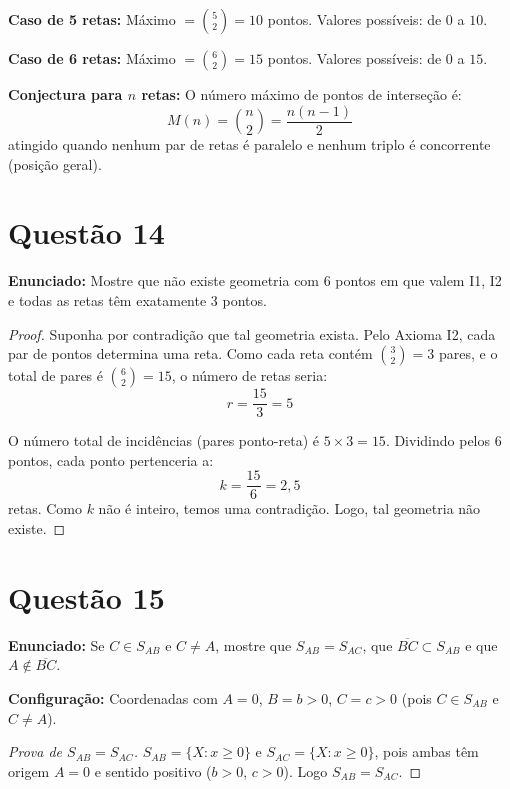 \documentclass[12pt,a4paper]{article}
\begin{document}
\textbf{Caso de 5 retas:} M\'aximo $= \binom{5}{2} = 10$ pontos. Valores poss\'iveis: de $0$ a $10$.

\textbf{Caso de 6 retas:} M\'aximo $= \binom{6}{2} = 15$ pontos. Valores poss\'iveis: de $0$ a $15$.

\textbf{Conjectura para $n$ retas:} O n\'umero m\'aximo de pontos de interse\c{c}\~ao \'e:
$$\boxed{M(n) = \binom{n}{2} = \frac{n(n-1)}{2}}$$
atingido quando nenhum par de retas \'e paralelo e nenhum triplo \'e concorrente (posi\c{c}\~ao geral).

\section*{Quest\~ao 14}

\textbf{Enunciado:} Mostre que n\~ao existe geometria com 6 pontos em que valem I1, I2 e todas as retas t\^em exatamente 3 pontos.

\begin{proof}
Suponha por contradi\c{c}\~ao que tal geometria exista. Pelo Axioma I2, cada par de pontos determina uma reta. Como cada reta cont\'em $\binom{3}{2} = 3$ pares, e o total de pares \'e $\binom{6}{2} = 15$, o n\'umero de retas seria:
$$r = \frac{15}{3} = 5$$

O n\'umero total de incid\^encias (pares ponto-reta) \'e $5 \times 3 = 15$. Dividindo pelos 6 pontos, cada ponto pertenceria a:
$$k = \frac{15}{6} = 2{,}5$$
retas. Como $k$ n\~ao \'e inteiro, temos uma contradi\c{c}\~ao. Logo, tal geometria n\~ao existe.
\end{proof}

\section*{Quest\~ao 15}

\textbf{Enunciado:} Se $C \in S_{AB}$ e $C \neq A$, mostre que $S_{AB} = S_{AC}$, que $\overline{BC} \subset S_{AB}$ e que $A \notin \overline{BC}$.

\textbf{Configura\c{c}\~ao:} Coordenadas com $A = 0$, $B = b > 0$, $C = c > 0$ (pois $C \in S_{AB}$ e $C \neq A$).

\begin{proof}[Prova de $S_{AB} = S_{AC}$]
$S_{AB} = \{X : x \geq 0\}$ e $S_{AC} = \{X : x \geq 0\}$, pois ambas t\^em origem $A = 0$ e sentido positivo ($b > 0$, $c > 0$). Logo $S_{AB} = S_{AC}$.
\end{proof}
\end{document}
